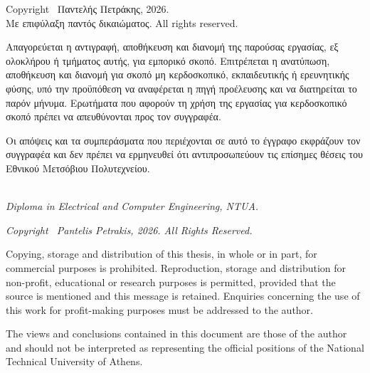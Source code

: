 {\small
\noindent
Copyright \textcopyright\ Παντελής Πετράκης, 2026.\\
Με επιφύλαξη παντός δικαιώματος. All rights reserved.

\vspace{0.4cm}

\noindent
Απαγορεύεται η αντιγραφή, αποθήκευση και διανομή της παρούσας εργασίας,
εξ ολοκλήρου ή τμήματος αυτής, για εμπορικό σκοπό.
Επιτρέπεται η ανατύπωση, αποθήκευση και διανομή για σκοπό μη κερδοσκοπικό,
εκπαιδευτικής ή ερευνητικής φύσης, υπό την προϋπόθεση να αναφέρεται η πηγή
προέλευσης και να διατηρείται το παρόν μήνυμα.
Ερωτήματα που αφορούν τη χρήση της εργασίας για κερδοσκοπικό σκοπό πρέπει
να απευθύνονται προς τον συγγραφέα.

\vspace{0.4cm}

\noindent
Οι απόψεις και τα συμπεράσματα που περιέχονται σε αυτό το έγγραφο εκφράζουν
τον συγγραφέα και δεν πρέπει να ερμηνευθεί ότι αντιπροσωπεύουν τις επίσημες
θέσεις του Εθνικού Μετσόβιου Πολυτεχνείου.
}

\vspace{0.55cm}

\\[0.1em]
{\small\itshape Diploma in Electrical and Computer Engineering, NTUA.}

\vspace{0.35cm}

{\small\itshape
\noindent
Copyright \textcopyright\ Pantelis Petrakis, 2026. All Rights Reserved.

\vspace{0.35cm}

\noindent
Copying, storage and distribution of this thesis, in whole or in part, for
commercial purposes is prohibited.
Reproduction, storage and distribution for non-profit, educational or research
purposes is permitted, provided that the source is mentioned and this message
is retained.
Enquiries concerning the use of this work for profit-making purposes must be
addressed to the author.

\vspace{0.35cm}

\noindent
The views and conclusions contained in this document are those of the author and
should not be interpreted as representing the official positions of the National
Technical University of Athens.
}

\clearpage
